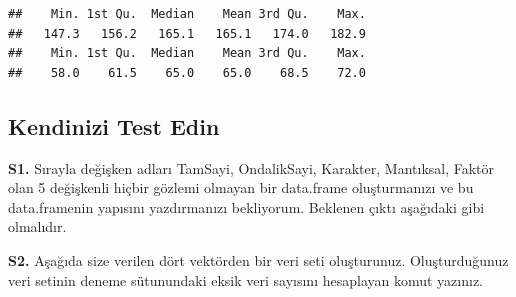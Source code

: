 \documentclass[
  oneside]{book}
\newenvironment{Shaded}{\begin{snugshade}}{\end{snugshade}}
\newcommand{\CommentTok}[1]{\textcolor[rgb]{0.56,0.35,0.01}{\textit{#1}}}
\newcommand{\ConstantTok}[1]{\textcolor[rgb]{0.56,0.35,0.01}{#1}}
\newcommand{\DecValTok}[1]{\textcolor[rgb]{0.00,0.00,0.81}{#1}}
\newcommand{\ErrorTok}[1]{\textcolor[rgb]{0.64,0.00,0.00}{\textbf{#1}}}
\newcommand{\FunctionTok}[1]{\textcolor[rgb]{0.13,0.29,0.53}{\textbf{#1}}}
\newcommand{\NormalTok}[1]{#1}
\newcommand{\SpecialCharTok}[1]{\textcolor[rgb]{0.81,0.36,0.00}{\textbf{#1}}}
\newcommand{\StringTok}[1]{\textcolor[rgb]{0.31,0.60,0.02}{#1}}
\begin{document}
\begin{Shaded}
\end{Shaded}

\begin{verbatim}
##    Min. 1st Qu.  Median    Mean 3rd Qu.    Max. 
##   147.3   156.2   165.1   165.1   174.0   182.9 
##    Min. 1st Qu.  Median    Mean 3rd Qu.    Max. 
##    58.0    61.5    65.0    65.0    68.5    72.0
\end{verbatim}

\hypertarget{kendinizi-test-edin-1}{%
\subsection{Kendinizi Test Edin}\label{kendinizi-test-edin-1}}

\textbf{S1.} Sırayla değişken adları TamSayi, OndalikSayi, Karakter, Mantıksal, Faktör olan 5 değişkenli hiçbir gözlemi olmayan bir data.frame oluşturmanızı ve bu data.framenin yapısını yazdırmanızı bekliyorum. Beklenen çıktı aşağıdaki gibi olmalıdır.

\begin{Shaded}
\end{Shaded}

\textbf{S2.} Aşağıda size verilen dört vektörden bir veri seti oluşturunuz. Oluşturduğunuz veri setinin deneme sütunundaki eksik veri sayısını hesaplayan komut yazınız.
\end{document}
